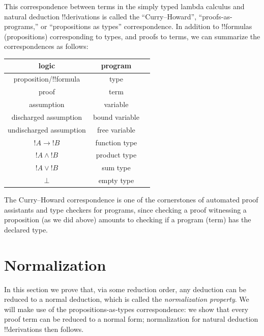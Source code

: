 \documentclass[10pt,a4paper]{article}
\theoremstyle{plain}
\theoremstyle{definition}
\theoremstyle{remark}
\newcommand*{\olfileid}[3]{}
\newcommand*{\olsection}[1]{\section*{#1}}
\providecommand{\lif}{\mathbin{\rightarrow}}
\providecommand{\lfalse}{\bot}
\begin{document}
This correspondence between terms in the simply typed lambda calculus
and natural deduction !!{derivation}s is called the ``Curry--Howard'',
``proofs-as-programs,'' or ``propositions as types'' correspondence.
In addition to !!{formula}s (propositions) corresponding to types, and
proofs to terms, we can summarize the correspondences as follows:
\begin{center}
  \begin{tabular}{c c c}
    logic & program \\
    \hline
    proposition/!!{formula} & type \\
    proof & term \\
    assumption & variable \\
    discharged assumption & bound variable \\
    undischarged assumption & free variable \\
    $!A \lif !B$ & function type \\
    $!A \land !B$ & product type \\
    $!A \lor !B$ & sum type \\
    $\lfalse$ & empty type \\
    \hline
  \end{tabular}
\end{center}

The Curry--Howard correspondence is one of the cornerstones of
automated proof assistants and type checkers for programs, since
checking a proof witnessing a proposition (as we did above) amounts to
checking if a program (term) has the declared type.




\olfileid{int}{pty}{nor}

\olsection{Normalization}

In this section we prove that, via some reduction order, any deduction
can be reduced to a normal deduction, which is called the
\emph{normalization property}. We will make use of the
propositions-as-types correspondence: we show that every proof term
can be reduced to a normal form; normalization for natural deduction
!!{derivation}s then follows.
\end{document}
